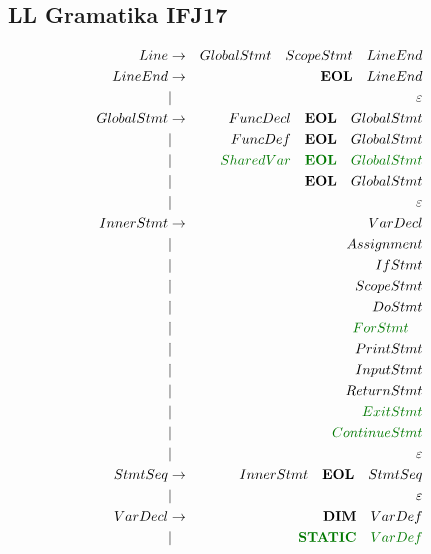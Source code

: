 \documentclass[a4paper,11pt,leqno]{article}
\begin{document}
\begin{landscape}
\section*{LL Gramatika IFJ17}
\label{ll_grammar}
\small
\begin{eqnarray}
Line		&	\rightarrow		& GlobalStmt\quad ScopeStmt\quad  LineEnd	 \\
LineEnd		& \rightarrow		& \textbf{EOL}\quad LineEnd\\
			&		|			& \varepsilon		  \\
GlobalStmt	&	\rightarrow		&  FuncDecl\quad \textbf{EOL}\quad GlobalStmt	 \\
			&		|			& FuncDef\quad \textbf{EOL}\quad GlobalStmt    \\
			&		|			& \textcolor{green1}{SharedVar\quad \textbf{EOL}\quad GlobalStmt}	 \\
			&		|			& \textbf{EOL}\quad GlobalStmt\\
			&		|			& \varepsilon \\
InnerStmt	&	\rightarrow		& VarDecl  \\
			&		|			& Assignment	\\
			&		|			& IfStmt	\\
			&		|			& ScopeStmt   \\
			&		|			& DoStmt  \\
			&		|			& \textcolor{green1}{ForStmt}\quad	\\
			&		|			& PrintStmt \\
			&		|			& InputStmt  \\
			&		|			& ReturnStmt  \\
			&		|			& \textcolor{green1}{ExitStmt}	\\
			&		|			& \textcolor{green1}{ContinueStmt}	\\
			&		|			& \varepsilon \\
StmtSeq		&	 \rightarrow	& InnerStmt\quad \textbf{EOL}\quad StmtSeq	 \\
			&		|			& \varepsilon \\
VarDecl		& \rightarrow		& \textbf{DIM}\quad VarDef \\
			&		|			& \textcolor{green1}{\textbf{STATIC}\quad VarDef} \\

\end{eqnarray}
\end{landscape}
\end{document}
